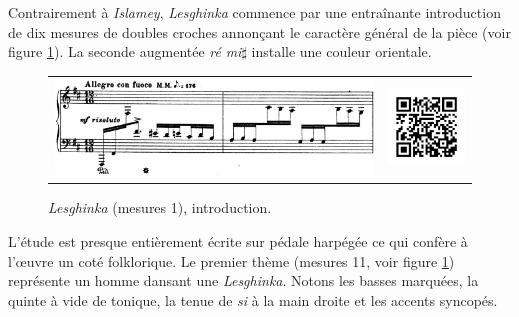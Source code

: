 Contrairement à \emph{Islamey}, \emph{Lesghinka} commence par une entraînante introduction de dix mesures de doubles croches annonçant le caractère général de la pièce (voir figure \ref{lesghinka-1}). La seconde augmentée \emph{ré} \emph{mi}$\sharp$ installe une couleur orientale.

\begin{figure}[!ht]
  \begin{bigcenter}
    \vspace*{0.25cm}
    \begin{tabular}{lr}
      \includegraphics[width=12.5cm, keepaspectratio]{lesghinka-intro.png}
      &
      \includegraphics[width=3cm, keepaspectratio]{op11-qr.png}
    \end{tabular}
  \end{bigcenter}
  \caption{\label{lesghinka-1}\emph{Lesghinka} (mesures 1), introduction.}
\end{figure}

L'étude est presque entièrement écrite sur pédale harpégée ce qui confère à l'œuvre un coté folklorique. Le premier thème (mesures 11, voir figure \ref{lesghinka-1}) représente un homme dansant une \emph{Lesghinka}. Notons les basses marquées, la quinte à vide de tonique, la tenue de \emph{si} à la main droite et les accents syncopés.

